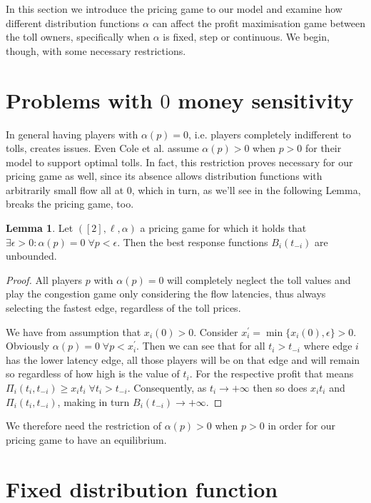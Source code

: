 \documentclass[10pt,a4paper]{book}
\theoremstyle{definition}
\newtheorem{lemma}[definition]{Lemma}
\theoremstyle{comment}
\begin{document}
In this section we introduce the pricing game to our model and examine how different distribution functions $\alpha$ can affect the profit maximisation game between the toll owners, specifically when $\alpha$ is fixed, step or continuous.
We begin, though, with some necessary restrictions.

\section{Problems with $0$ money sensitivity}

In general having players with $\alpha(p) = 0$, i.e. players completely indifferent to tolls, creates issues.
Even Cole et al. \cite{10.1145/780542.780618} assume $\alpha(p) > 0$ when $p > 0$ for their model to support optimal tolls.
In fact, this restriction proves necessary for our pricing game as well, since its absence allows distribution functions with arbitrarily small flow all at $0$, which in turn, as we'll see in the following Lemma, breaks the pricing game, too.

\begin{lemma}
	\label{lemma:a_0_0}
	Let $([2], \ell, \alpha)$ a pricing game for which it holds that $\exists \epsilon > 0: \alpha(p) = 0 \; \forall p < \epsilon$.
	Then the best response functions $B_i(t_{-i})$ are unbounded.
\end{lemma}

\begin{proof}
	All players $p$ with $\alpha(p) = 0$ will completely neglect the toll values and play the congestion game only considering the flow latencies, thus always selecting the fastest edge, regardless of the toll prices.

	We have from assumption that $x_i(0) > 0$.
	Consider $x_i^\prime = \min\{x_i(0), \epsilon\} > 0$.
	Obviously $\alpha(p) = 0 \; \forall p < x_i^\prime$.
	Then we can see that for all $t_i > t_{-i}$ where edge $i$ has the lower latency edge, all those players will be on that edge and will remain so regardless of how high is the value of $t_i$.
	For the respective profit that means $\Pi_i(t_i, t_{-i}) \ge x_i t_i \; \forall t_i > t_{-i}$.
	Consequently, as $t_i \rightarrow +\infty$ then so does $x_i t_i$ and $\Pi_i(t_i, t_{-i})$, making in turn $B_i(t_{-i}) \rightarrow +\infty$.
\end{proof}
We therefore need the restriction of $\alpha(p) > 0$ when $p > 0$ in order for our pricing game to have an equilibrium.

\section{Fixed distribution function}
\end{document}
